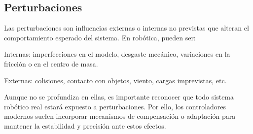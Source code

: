 \subsection{Perturbaciones}

Las perturbaciones son influencias externas o internas no previstas que alteran el comportamiento esperado del sistema. En robótica, pueden ser:

Internas: imperfecciones en el modelo, desgaste mecánico, variaciones en la fricción o en el centro de masa.

Externas: colisiones, contacto con objetos, viento, cargas imprevistas, etc.

Aunque no se profundiza en ellas, es importante reconocer que todo sistema robótico real estará expuesto a perturbaciones. Por ello, los controladores modernos suelen incorporar mecanismos de compensación o adaptación para mantener la estabilidad y precisión ante estos efectos.